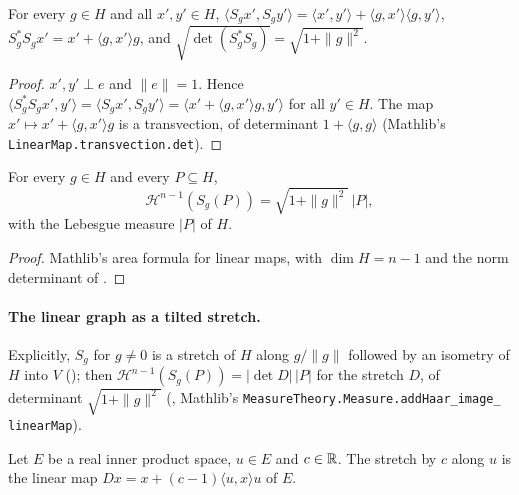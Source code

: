 \begin{lemma}
\label{lem:linear-graph-normdet}
\leanok
{}
For every $g \in H$ and all $x', y' \in H$,
$\langle S_g x', S_g y' \rangle
= \langle x', y' \rangle + \langle g, x' \rangle \langle g, y' \rangle$,
$S_g^* S_g x' = x' + \langle g, x' \rangle g$, and $\sqrt{\det(S_g^* S_g)} = \sqrt{1 + \|g\|^2}$.
\end{lemma}

\begin{proof}
\leanok
$x', y' \perp e$ and $\|e\| = 1$. Hence $\langle S_g^* S_g x', y' \rangle = \langle S_g x', S_g y'
\rangle = \langle x' + \langle g, x' \rangle g, y' \rangle$ for all $y' \in H$. The map
$x' \mapsto x' + \langle g, x' \rangle g$ is a transvection, of determinant
$1 + \langle g, g \rangle$ (Mathlib's \texttt{LinearMap.\allowbreak transvection.\allowbreak det}).
\end{proof}

\begin{theorem}
\label{thm:linear-graph-area}
\leanok
{}
For every $g \in H$ and every $P \subseteq H$,
\[
  \mathcal H^{n-1}(S_g(P)) = \sqrt{1 + \|g\|^2} \, |P| ,
\]
with the Lebesgue measure $|P|$ of $H$.
\end{theorem}

\begin{proof}
\leanok
Mathlib's area formula for linear maps, with $\dim H = n - 1$ and the norm determinant of
.
\end{proof}

\paragraph{The linear graph as a tilted stretch.} Explicitly, $S_g$ for $g \neq 0$ is a stretch of
$H$ along $g/\|g\|$ followed by an isometry of $H$ into $V$ (); then
$\mathcal H^{n-1}(S_g(P)) = |\det D| \, |P|$ for the stretch $D$, of determinant
$\sqrt{1 + \|g\|^2}$ (, Mathlib's
\texttt{MeasureTheory.\allowbreak Measure.\allowbreak addHaar\_\allowbreak image\_\allowbreak
linearMap}).

\begin{definition}[Stretches]
\label{def:stretch}
\leanok
Let $E$ be a real inner product space, $u \in E$ and $c \in \mathbb{R}$. The stretch by $c$ along $u$ is
the linear map $D x = x + (c - 1) \langle u, x \rangle u$ of $E$.
\end{definition}

